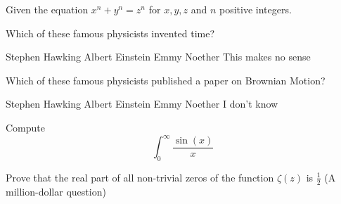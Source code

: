\documentclass[addpoints]{exam}
\begin{document}
\begin{questions}

\question Given the equation \(x^n + y^n = z^n\) for \(x,y,z\) and \(n\) positive
integers. 

\droptotalpoints %

\question Which of these famous physicists invented time?

\begin{oneparchoices}
 \choice Stephen Hawking 
 \choice Albert Einstein
 \choice Emmy Noether
 \choice This makes no sense
\end{oneparchoices}

\question Which of these famous physicists published a paper on Brownian Motion?

\begin{checkboxes}
 \choice Stephen Hawking 
 \choice Albert Einstein
 \choice Emmy Noether
 \choice I don't know
\end{checkboxes}

\question[20] Compute \[\int_{0}^{\infty} \frac{\sin(x)}{x}\]


\bonusquestion[30] Prove that the real part of all non-trivial zeros of the function 
\(\zeta(z)\) is \(\frac{1}{2}\) (A million-dollar question)

\end{questions}

\clearpage
\begin{center}
\combinedgradetable[h][questions]
\end{center}
\end{document}
